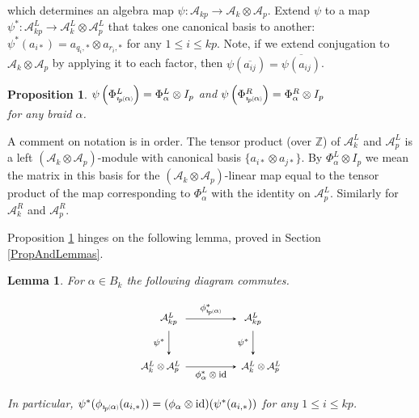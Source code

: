 \documentclass[11pt]{amsart}
\def\Z{{\mathbb Z}}
\def\A{{\mathcal A}}
\newcommand*{\subsmallp}[1]{\scalebox{.5}{\ensuremath#1}}
\newcommand{\subpp}[2][p]{\imath_{\hspace*{-1pt}#1}\hspace*{-.5pt}\subsmallp(#2\subsmallp)}
\newcommand\id{\operatorname{id}}
\newtheorem{lem}[thm]{Lemma}
\newtheorem{prop}[thm]{Proposition}
\theoremstyle{definition}
\begin{document}
\noindent which determines an algebra map $\psi\colon \A_{kp} \rightarrow \A_k\otimes \A_p$. Extend $\psi$ to a map $\psi^\ast:\A_{kp}^L\to\A_k^L\otimes\A_p^L$ that takes one canonical basis to another: $\psi^\ast(a_{i\ast}) = a_{q_i,\ast}\otimes a_{r_i,\ast}$ for any $1\le i\le kp$. Note, if we extend conjugation to $\A_k\otimes\A_p$ by applying it to each factor, then $\psi(\overline{a_{ij}}) = \overline{\psi(a_{ij})}$.

\begin{prop}\label{psiofbp}
$\psi\left(\Phi_{\subpp\alpha}^L\right) = \Phi_\alpha^L\otimes I_p$ and $\psi\left(\Phi_{\subpp\alpha}^R\right) = \Phi_\alpha^R\otimes I_p$\\
for any braid $\alpha$.
\end{prop}

A comment on notation is in order. The tensor product (over $\Z$) of $\A_k^L$ and $\A_p^L$ is a left $(\A_k\otimes\A_p)$-module with canonical basis $\{a_{i\ast}\otimes a_{j\ast}\}$. By $\Phi_\alpha^L\otimes I_p$ we mean the matrix in this basis for the $(\A_k\otimes\A_p)$-linear map equal to the tensor product of the map corresponding to $\Phi_\alpha^L$ with the identity on $\A_p^L$. Similarly for $\A_k^R$ and $\A_p^R$.

Proposition \ref{psiofbp} hinges on the following lemma, proved in Section \ref{PropAndLemmas}.

\begin{lem}\label{commutes} For $\alpha\in B_k$ the following diagram commutes.

  \[\begin{tikzpicture}[scale=.75,>=stealth]
    \foreach \m in {0,3.5}
      \draw (\m,2) node {\footnotesize $\A_{kp}^L$};
    \draw (.65,0) node[left] {\footnotesize $\A_k^L\otimes\A_p^L$}
          (2.85,0) node[right] {\footnotesize $\A_k^L\otimes\A_p^L$};
    \draw[->] (.7,2) -- node[above] {\footnotesize $\phi_{\subpp\alpha}^\ast$} (2.8,2);
    \draw[->] (.7,0) -- node[below] {\footnotesize $\phi_\alpha^\ast\otimes\id$} (2.8,0);
    \foreach \p in {0,3.5}
      \draw[->] (\p,1.5) -- node[left] {\footnotesize $\psi^\ast$} (\p,.5);
  \end{tikzpicture}\]

\noindent In particular, $\psi^\ast(\phi_{\subpp\alpha}(a_{i,\ast})) = (\phi_{\alpha} \otimes \id)(\psi^\ast(a_{i,\ast}))$ for any $1\le i\le kp$.
\end{lem}
\end{document}

